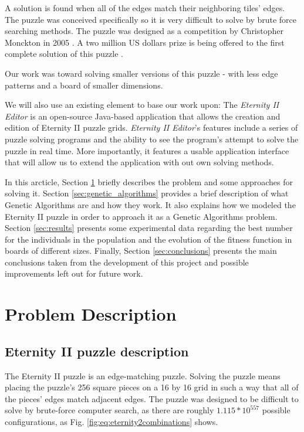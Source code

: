 \documentclass{llncs}
\begin{document}
A solution is found when all of the edges match their neighboring tiles' edges. The puzzle was conceived specifically so it is very difficult to solve by brute force searching methods. The puzzle was designed as a competition by Christopher Monckton in 2005 \cite{monckton}. A two million US dollars prize is being offered to the first complete solution of this puzzle \cite{unsolved}.

Our work was toward solving smaller versions of this puzzle - with less edge patterns and a board of smaller dimensions.

We will also use an existing element to base our work upon: The \textit{Eternity II Editor} is an open-source Java-based application that allows the creation and edition of Eternity II puzzle grids. \textit{Eternity II Editor}'s features include a series of puzzle solving programs and the ability to see the program's attempt to solve the puzzle in real time. More importantly, it features a usable application interface that will allow us to extend the application with out own solving methods.

In this arcticle, Section \ref{sec:problem_description} briefly describes the problem and  some approaches for solving it. Section \ref{sec:genetic_algorithms} provides a brief description of what Genetic Algorithms are and how they work. It also explains how we modeled the Eternity II puzzle in order to approach it as a Genetic Algorithms problem. Section \ref{sec:results} presents some experimental data regarding the best number for the individuals in the population and the evolution of the fitness function in boards of different sizes. Finally, Section \ref{sec:conclusions} presents the main conclusions taken from the development of this project and possible improvements left out for future work.

\section{Problem Description}\label{sec:problem_description}

\subsection{Eternity II puzzle description}\label{sec:puzzle_description}

The Eternity II puzzle is an edge-matching puzzle. Solving the puzzle means placing the puzzle's 256 square pieces on a 16 by 16 grid in such a way that all of the pieces' edges match adjacent edges. The puzzle was designed to be difficult to solve by brute-force computer search, as there are roughly $1.115 * 10 ^ {557}$ possible configurations, as Fig. \ref{fig:eq:eternity2combinations} shows.
\end{document}
